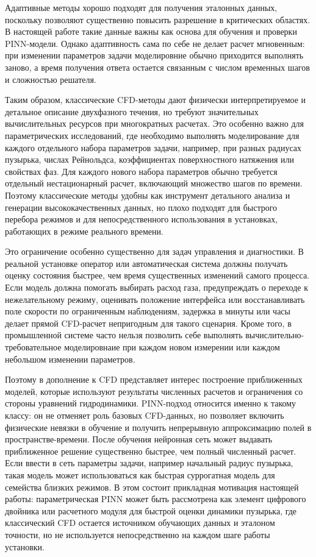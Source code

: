 \documentclass[12pt,a4paper]{article}
\begin{document}
Адаптивные методы хорошо подходят для получения эталонных данных, поскольку
позволяют существенно повысить разрешение в критических областях. В настоящей
работе такие данные важны как основа для обучения и проверки PINN-модели.
Однако адаптивность сама по себе не делает расчет мгновенным: при изменении
параметров задачи моделировние обычно приходится выполнять заново, а время
получения ответа остается связанным с числом временных шагов и сложностью
решателя.

Таким образом, классические CFD-методы дают физически интерпретируемое и
детальное описание двухфазного течения, но требуют значительных вычислительных
ресурсов при многократных расчетах. Это особенно важно для параметрических
исследований, где необходимо выполнять моделирование для каждого отдельного набора параметров задачи, например, при разных радиусах пузырька,
числах Рейнольдса, коэффициентах поверхностного натяжения или свойствах фаз.
Для каждого нового набора параметров обычно требуется отдельный нестационарный
расчет, включающий множество шагов по времени. Поэтому классические методы
удобны как инструмент детального анализа и генерации высококачественных данных,
но плохо подходят для быстрого перебора режимов и для непосредственного
использования в установках, работающих в режиме реального времени.

Это ограничение особенно существенно для задач управления и диагностики. В
реальной установке оператор или автоматическая система должны получать оценку
состояния быстрее, чем время существенных изменений самого процесса. Если модель должна
помогать выбирать расход газа, предупреждать о переходе к нежелательному
режиму, оценивать положение интерфейса или восстанавливать поле скорости
по ограниченным наблюдениям, задержка в минуты или часы делает прямой
CFD-расчет непригодным для такого сценария. Кроме того, в промышленной системе
часто нельзя позволить себе выполнять вычислительно-требовательное моделировнаие при каждом новом
измерении или каждом небольшом изменении параметров.

Поэтому в дополнение к CFD представляет интерес построение приближенных
моделей, которые используют результаты численных расчетов и ограничения со
стороны уравнений гидродинамики. PINN-подход относится именно к такому классу:
он не отменяет роль базовых CFD-данных, но позволяет включить физические
невязки в обучение и получить непрерывную аппроксимацию полей в
пространстве-времени. После обучения нейронная сеть может выдавать приближенное
решение существенно быстрее, чем полный численный расчет. Если ввести в сеть
параметры задачи, например начальный радиус пузырька, такая модель может
использоваться как быстрая суррогатная модель для семейства близких режимов. В
этом состоит прикладная мотивация настоящей работы: параметрическая PINN может
быть рассмотрена как элемент цифрового двойника или расчетного модуля для
быстрой оценки динамики пузырька, где классический CFD остается источником
обучающих данных и эталоном точности, но не используется непосредственно на
каждом шаге работы установки.
\end{document}
